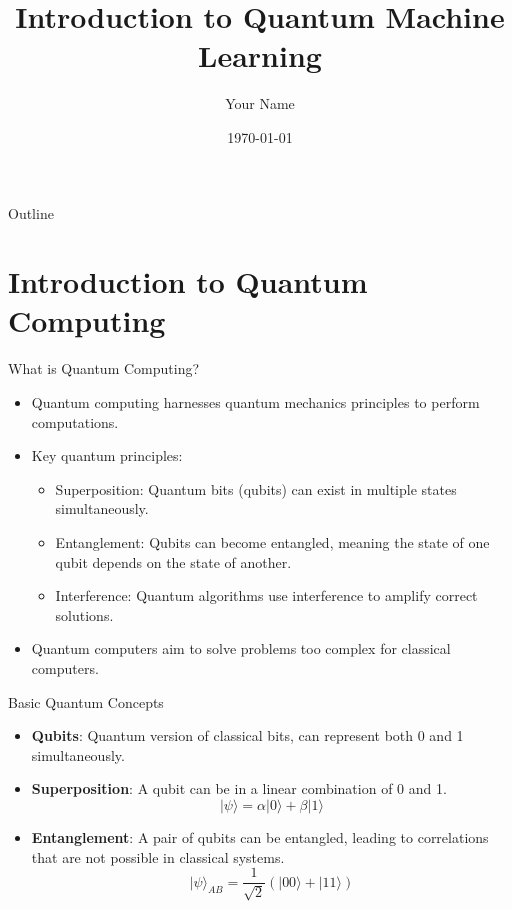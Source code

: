 \documentclass{beamer}
\title{Introduction to Quantum Machine Learning}
\author{Your Name}
\institute{Your Institution}
\date{\today}
\begin{document}
\begin{frame}
  \titlepage
\end{frame}

\begin{frame}{Outline}
  \tableofcontents
\end{frame}

\section{Introduction to Quantum Computing}

\begin{frame}{What is Quantum Computing?}
    \begin{itemize}
        \item Quantum computing harnesses quantum mechanics principles to perform computations.
        \item Key quantum principles:
        \begin{itemize}
            \item Superposition: Quantum bits (qubits) can exist in multiple states simultaneously.
            \item Entanglement: Qubits can become entangled, meaning the state of one qubit depends on the state of another.
            \item Interference: Quantum algorithms use interference to amplify correct solutions.
        \end{itemize}
        \item Quantum computers aim to solve problems too complex for classical computers.
    \end{itemize}
\end{frame}

\begin{frame}{Basic Quantum Concepts}
    \begin{itemize}
        \item \textbf{Qubits}: Quantum version of classical bits, can represent both 0 and 1 simultaneously.
        \item \textbf{Superposition}: A qubit can be in a linear combination of 0 and 1.
        \[
        |\psi\rangle = \alpha|0\rangle + \beta|1\rangle
        \]
        \item \textbf{Entanglement}: A pair of qubits can be entangled, leading to correlations that are not possible in classical systems.
        \[
        |\psi\rangle_{AB} = \frac{1}{\sqrt{2}} (|00\rangle + |11\rangle)
        \]
    \end{itemize}
\end{frame}
\end{document}
